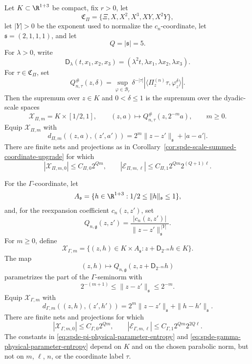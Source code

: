 \begin{proposition}
\label{prop:spde-negative-sector-physical-parameter-entropy}
Let \(K\subset\R^{1+3}\) be compact, fix \(r>0\), let
\[
  \mathfrak C_\Pi=\{\Xi,X,X^2,X^3,XY,X^2Y\},
\]
let \(|Y|>0\) be the exponent used to normalize the \(c_n\)-coordinate,
let \(\mathfrak s=(2,1,1,1)\), and let
\[
  Q=|\mathfrak s|=5 .
\]
For \(\lambda>0\), write
\[
  \mathsf D_\lambda(t,x_1,x_2,x_3)
  =
  (\lambda^2t,\lambda x_1,\lambda x_2,\lambda x_3).
\]
For \(\tau\in\mathfrak C_\Pi\), set
\[
  Q_{n,\tau}^{\#}(z,\delta)
  =
  \sup_{\varphi\in\mathcal B_r}
  \delta^{-|\tau|}
  \left|
    \langle\Pi_z^{(n)}\tau,\varphi_z^\delta\rangle
  \right|.
\]
Then the supremum over \(z\in K\) and \(0<\delta\leq1\) is the supremum over
the dyadic-scale spaces
\[
  \mathcal X_{\Pi,m}=K\times[1/2,1],
  \qquad
  (z,a)\longmapsto Q_{n,\tau}^{\#}(z,2^{-m}a),
  \qquad m\geq0.
\]
Equip \(\mathcal X_{\Pi,m}\) with
\[
  d_{\Pi,m}((z,a),(z',a'))
  =
  2^m\|z-z'\|_{\mathfrak s}+|a-a'|.
\]
There are finite nets and projections as in
Corollary~\ref{cor:spde-scale-summed-coordinate-upgrade} for which
\begin{equation}
  |\mathcal X_{\Pi,m,0}|\leq C_{\Pi,0}2^{Qm},
  \qquad
  |\mathcal E_{\Pi,m,\ell}|
  \leq
  C_{\Pi,1}2^{Qm}2^{(Q+1)\ell}.
  \label{eq:spde-pi-physical-parameter-entropy}
\end{equation}

For the \(\Gamma\)-coordinate, let
\[
  A_{\mathfrak s}
  =
  \{h\in\R^{1+3}:1/2\leq\|h\|_{\mathfrak s}\leq1\},
\]
and, for the reexpansion coefficient \(c_n(z,z')\), set
\[
  Q_{n,\mathfrak g}(z,z')
  =
  \frac{|c_n(z,z')|}
       {\|z-z'\|_{\mathfrak s}^{\,|Y|}} .
\]
For \(m\geq0\), define
\[
  \mathcal X_{\Gamma,m}
  =
  \{(z,h)\in K\times A_{\mathfrak s}:
      z+\mathsf D_{2^{-m}}h\in K\}.
\]
The map
\[
  (z,h)
  \longmapsto
  Q_{n,\mathfrak g}(z,z+\mathsf D_{2^{-m}}h)
\]
parametrizes the part of the \(\Gamma\)-seminorm with
\[
  2^{-(m+1)}
  \leq
  \|z-z'\|_{\mathfrak s}
  \leq
  2^{-m}.
\]
Equip \(\mathcal X_{\Gamma,m}\) with
\[
  d_{\Gamma,m}((z,h),(z',h'))
  =
  2^m\|z-z'\|_{\mathfrak s}+\|h-h'\|_{\mathfrak s}.
\]
There are finite nets and projections for which
\begin{equation}
  |\mathcal X_{\Gamma,m,0}|\leq C_{\Gamma,0}2^{Qm},
  \qquad
  |\mathcal E_{\Gamma,m,\ell}|
  \leq
  C_{\Gamma,1}2^{Qm}2^{2Q\ell}.
  \label{eq:spde-gamma-physical-parameter-entropy}
\end{equation}
The constants in
\eqref{eq:spde-pi-physical-parameter-entropy} and
\eqref{eq:spde-gamma-physical-parameter-entropy} depend on \(K\) and on the
chosen parabolic norm, but not on \(m\), \(\ell\), \(n\), or the coordinate
label \(\tau\).
\end{proposition}

